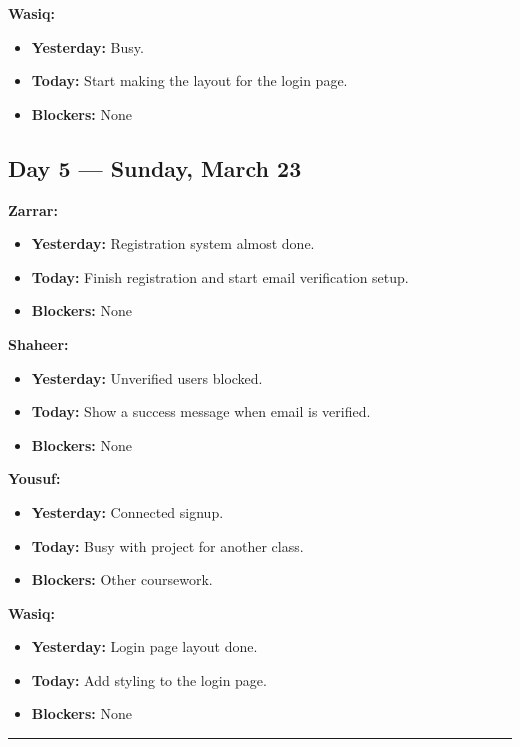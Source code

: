 \documentclass[12pt,a4paper]{article}
\begin{document}
\textbf{Wasiq:}
\begin{itemize}[noitemsep]
    \item \textbf{Yesterday:} Busy.
    \item \textbf{Today:} Start making the layout for the login page.
    \item \textbf{Blockers:} None
\end{itemize}

\newpage

\subsection*{Day 5 --- Sunday, March 23}

\textbf{Zarrar:}
\begin{itemize}[noitemsep]
    \item \textbf{Yesterday:} Registration system almost done.
    \item \textbf{Today:} Finish registration and start email verification setup.
    \item \textbf{Blockers:} None
\end{itemize}

\textbf{Shaheer:}
\begin{itemize}[noitemsep]
    \item \textbf{Yesterday:} Unverified users blocked.
    \item \textbf{Today:} Show a success message when email is verified.
    \item \textbf{Blockers:} None
\end{itemize}

\textbf{Yousuf:}
\begin{itemize}[noitemsep]
    \item \textbf{Yesterday:} Connected signup.
    \item \textbf{Today:} Busy with project for another class.
    \item \textbf{Blockers:} Other coursework.
\end{itemize}

\textbf{Wasiq:}
\begin{itemize}[noitemsep]
    \item \textbf{Yesterday:} Login page layout done.
    \item \textbf{Today:} Add styling to the login page.
    \item \textbf{Blockers:} None
\end{itemize}

\vspace{1em}
\hrule
\vspace{1em}
\end{document}
